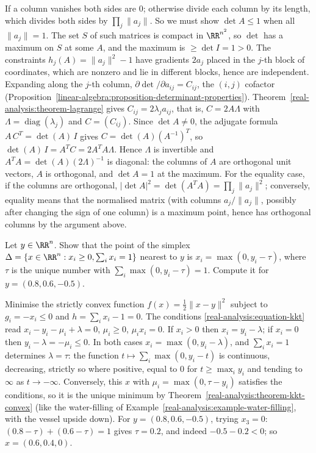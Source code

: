 \begin{solution}
If a column vanishes both sides are $0$; otherwise divide each column by its length, which divides both sides by $\prod_j\|a_j\|$. So we must show $\det A \leq 1$ when all $\|a_j\| = 1$. The set $S$ of
such matrices is compact in $\RR^{n^2}$, so $\det$ has a maximum on $S$ at some $A$, and the maximum is $\geq \det I = 1 > 0$. The constraints $h_j(A) = \|a_j\|^2 - 1$ have gradients $2a_j$ placed in the
$j$-th block of coordinates, which are nonzero and lie in different blocks, hence are independent. Expanding along the $j$-th column, $\partial\det/\partial a_{ij} = C_{ij}$, the $(i, j)$ cofactor
(Proposition~\ref{linear-algebra:proposition-determinant-properties}). Theorem~\ref{real-analysis:theorem-lagrange} gives $C_{ij} = 2\lambda_ja_{ij}$, that is, $C = 2A\Lambda$ with
$\Lambda = \operatorname{diag}(\lambda_j)$ and $C = (C_{ij})$. Since $\det A \neq 0$, the adjugate formula $A\,C^T = \det(A)\,I$ gives $C = \det(A)(A^{-1})^T$, so $\det(A)\,I = A^TC = 2A^TA\Lambda$. Hence $\Lambda$ is invertible and
$A^TA = \det(A)(2\Lambda)^{-1}$ is diagonal: the columns of $A$ are orthogonal unit vectors, $A$ is orthogonal, and $\det A = 1$ at the maximum. For the equality case, if the columns are orthogonal,
$|\det A|^2 = \det(A^TA) = \prod_j\|a_j\|^2$; conversely, equality means that the normalised matrix (with columns $a_j/\|a_j\|$, possibly after changing the sign of one column) is a maximum point, hence
has orthogonal columns by the argument above.
\end{solution}

\begin{exercise}\label{real-analysis:exercise-projection-simplex}
Let $y \in \RR^n$. Show that the point of the simplex $\Delta = \{x \in \RR^n : x_i \geq 0, \sum_ix_i = 1\}$ nearest to $y$ is $x_i = \max(0, y_i - \tau)$, where $\tau$ is the unique number with
$\sum_i\max(0, y_i - \tau) = 1$. Compute it for $y = (0.8, 0.6, -0.5)$.
\end{exercise}

\begin{solution}
Minimise the strictly convex function $f(x) = \frac12\|x - y\|^2$ subject to $g_i = -x_i \leq 0$ and $h = \sum_ix_i - 1 = 0$. The conditions \eqref{real-analysis:equation-kkt} read
$x_i - y_i - \mu_i + \lambda = 0$, $\mu_i \geq 0$, $\mu_ix_i = 0$. If $x_i > 0$ then $x_i = y_i - \lambda$; if $x_i = 0$ then $y_i - \lambda = -\mu_i \leq 0$. In both cases $x_i = \max(0, y_i - \lambda)$, and
$\sum_ix_i = 1$ determines $\lambda = \tau$: the function $t \mapsto \sum_i\max(0, y_i - t)$ is continuous, decreasing, strictly so where positive, equal to $0$ for $t \geq \max_iy_i$ and tending to $\infty$ as
$t \to -\infty$. Conversely, this $x$ with $\mu_i = \max(0, \tau - y_i)$ satisfies the conditions, so it is the unique minimum by Theorem~\ref{real-analysis:theorem-kkt-convex} (like the water-filling of
Example~\ref{real-analysis:example-water-filling}, with the vessel upside down). For $y = (0.8, 0.6, -0.5)$, trying $x_3 = 0$: $(0.8 - \tau) + (0.6 - \tau) = 1$ gives $\tau = 0.2$, and indeed
$-0.5 - 0.2 < 0$; so $x = (0.6, 0.4, 0)$.
\end{solution}

